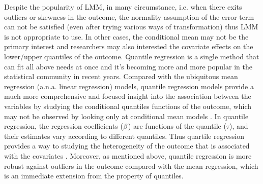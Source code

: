 \documentclass{article}
\begin{document}
Despite the popularity of LMM, in many circumstance, i.e. when there exits outliers or skewness in the outcome,  the normality assumption of the error term can not be satisfied (even after trying various ways of transformation) thus LMM is not appropriate to use. In other cases, the conditional mean may not be the primary interest and researchers may also interested the covariate effects on the lower/upper quantiles of the outcome. Quantile regression is a single method that can fit all above needs at once and it's becoming more and more popular in the statistical community in recent years. Compared with the ubiquitous mean regression (a.n.a. linear regression) models, quantile regression models provide a much more comprehensive and focused insight into the association between the variables by studying the conditional quantiles functions of the outcome,  which may not be observed by looking only at conditional mean models \cite{koenker2005quantile}. In quantile regression, the regression coefficients (${\bf \beta}$) are functions of the quantile ($\tau$), and their estimates vary according to different quantiles. Thus quartile regression provides a way to studying the heterogeneity of the outcome that is associated with the covariates \cite{koenker2005quantile}. Moreover, as mentioned above, quantile regression is more robust against outliers in the outcome compared with the mean regression, which is an immediate extension from the property of quantiles. \par
\end{document}

